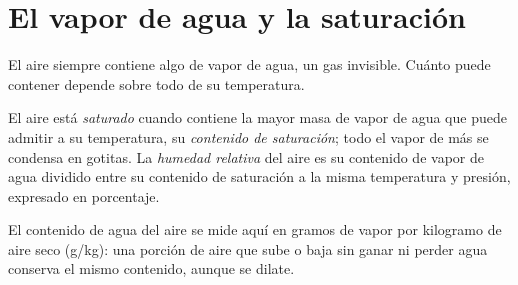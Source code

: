 \section{El vapor de agua y la saturación}

El aire siempre contiene algo de vapor de agua, un gas invisible. Cuánto
puede contener depende sobre todo de su temperatura.

\begin{definition}\label{def:g10:why-clouds-form:humidity}
El aire está \emph{saturado} cuando contiene la
mayor masa de vapor de agua que puede admitir a su temperatura, su
\emph{contenido de saturación}; todo el vapor de más se condensa en gotitas.
La \emph{humedad relativa} del aire es su contenido
de vapor de agua dividido entre su contenido de saturación a la misma
temperatura y presión, expresado en porcentaje.
\end{definition}

El contenido de agua del aire se mide aquí en gramos de vapor por kilogramo
de aire seco (\unit{g/kg}): una porción de aire que sube o baja sin ganar ni
perder agua conserva el mismo contenido, aunque se dilate.


